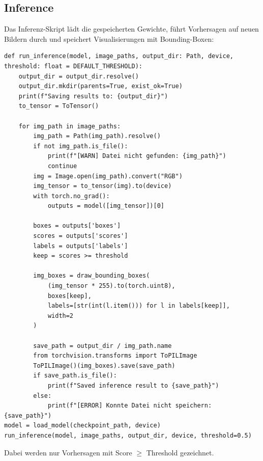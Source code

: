 \documentclass[11pt,a4paper]{article}
\begin{document}
\subsection{Inference}
Das Inferenz-Skript lädt die gespeicherten Gewichte, führt Vorhersagen auf neuen Bildern durch und speichert Visualisierungen mit Bounding-Boxen:
\begin{lstlisting}
def run_inference(model, image_paths, output_dir: Path, device, threshold: float = DEFAULT_THRESHOLD):
    output_dir = output_dir.resolve()
    output_dir.mkdir(parents=True, exist_ok=True)
    print(f"Saving results to: {output_dir}")
    to_tensor = ToTensor()

    for img_path in image_paths:
        img_path = Path(img_path).resolve()
        if not img_path.is_file():
            print(f"[WARN] Datei nicht gefunden: {img_path}")
            continue
        img = Image.open(img_path).convert("RGB")
        img_tensor = to_tensor(img).to(device)
        with torch.no_grad():
            outputs = model([img_tensor])[0]

        boxes = outputs['boxes']
        scores = outputs['scores']
        labels = outputs['labels']
        keep = scores >= threshold

        img_boxes = draw_bounding_boxes(
            (img_tensor * 255).to(torch.uint8),
            boxes[keep],
            labels=[str(int(l.item())) for l in labels[keep]],
            width=2
        )

        save_path = output_dir / img_path.name
        from torchvision.transforms import ToPILImage
        ToPILImage()(img_boxes).save(save_path)
        if save_path.is_file():
            print(f"Saved inference result to {save_path}")
        else:
            print(f"[ERROR] Konnte Datei nicht speichern: {save_path}")
model = load_model(checkpoint_path, device)
run_inference(model, image_paths, output_dir, device, threshold=0.5)
\end{lstlisting}
Dabei werden nur Vorhersagen mit Score $\geq$ Threshold gezeichnet.
\newpage
\end{document}
